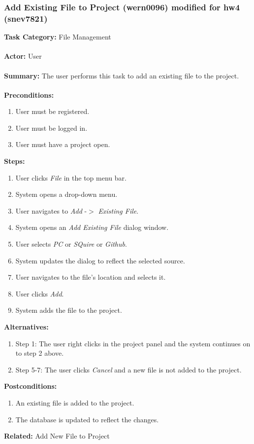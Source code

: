 \documentclass[11pt]{report}
\begin{document}
\newpage

\subsubsection{Add Existing File to Project (wern0096) modified for hw4 (snev7821)}
\begin{framed}

	\textbf{Task Category:} File Management \\ \\
	\textbf{Actor:} User \\ \\
	\textbf{Summary:} The user performs this task to add an existing file to the project. \\ \\
	\textbf{Preconditions:} 
	\begin{enumerate}
		\item User must be registered.
		\item User must be logged in.
		\item User must have a project open.
	\end{enumerate}
	\textbf{Steps:}
	\begin{enumerate}
		\item User clicks \textit{File} in the top menu bar.
		\item System opens a drop-down menu.
		\item User navigates to \textit{Add} -$>$ \textit{Existing File}.
		\item System opens an \textit{Add Existing File} dialog window.
		\item User selects \textit{PC} or \textit{SQuire} or \textit{Github}.
		\item System updates the dialog to reflect the selected source.
		\item User navigates to the file's location and selects it.
		\item User clicks \textit{Add}.
		\item System adds the file to the project.
	\end{enumerate}
	\textbf{Alternatives:} 
	\begin{enumerate}
		\item Step 1: The user right clicks in the project panel and the system continues on to step 2 above.
		\item Step 5-7: The user clicks \textit{Cancel} and a new file is not added to the project.
	\end{enumerate}
	\textbf{Postconditions:}
	\begin{enumerate}
		\item An existing file is added to the project.
		\item The database is updated to reflect the changes.
	\end{enumerate}
	\textbf{Related:} Add New File to Project
\end{framed} 
\end{document}
